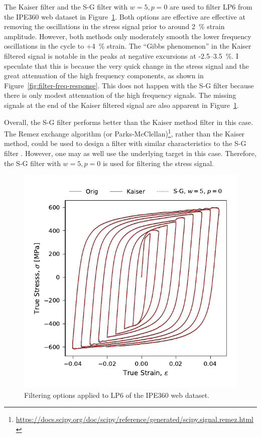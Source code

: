 \documentclass[a4paper,11pt]{article}
\begin{document}
The Kaiser filter and the S-G filter with $w = 5, p = 0$ are used to filter LP6 from the IPE360 web dataset in Figure~\ref{fig:filtering-options}.
Both options are effective are effective at removing the oscillations in the stress signal prior to around 2~\% strain amplitude.
However, both methods only moderately smooth the lower frequency oscillations in the cycle to +4~\% strain.
The ``Gibbs phenomenon'' in the Kaiser filtered signal is notable in the peaks at negative excursions at -2.5--3.5~\%.
I speculate that this is because the very quick change in the stress signal and the great attenuation of the high frequency components, as shown in Figure~\ref{fig:filter-freq-response}.
This does not happen with the S-G filter because there is only modest attenuation of the high frequency signals.
The missing signals at the end of the Kaiser filtered signal are also apparent in Figure~\ref{fig:filtering-options}.

Overall, the S-G filter performs better than the Kaiser method filter in this case.
The Remez exchange algorithm (or Parks-McClellan)\footnote{\url{https://docs.scipy.org/doc/scipy/reference/generated/scipy.signal.remez.html}}, rather than the Kaiser method, could be used to design a filter with similar characteristics to the S-G filter \citep{SchaferWhatSavitzkyGolayFilter2011}.
However, one may as well use the underlying target in this case.
Therefore, the S-G filter with $w = 5, p = 0$ is used for filtering the stress signal.


\begin{figure}
    \centering
    \includegraphics{test_kaiser_win.pdf}
    \caption{Filtering options applied to LP6 of the IPE360 web dataset.}
    \label{fig:filtering-options}
\end{figure}
\end{document}
